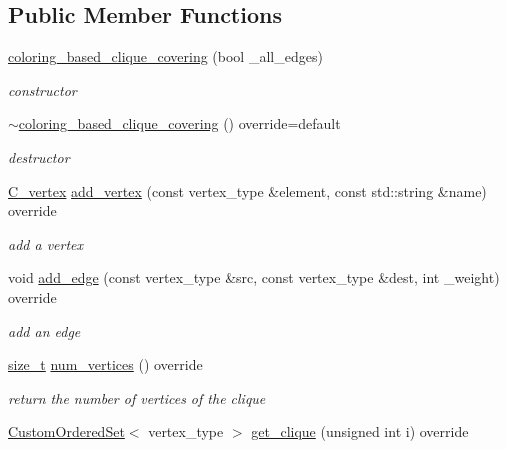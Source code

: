 \subsection*{Public Member Functions}
\begin{DoxyCompactItemize}
\item 
\hyperlink{classcoloring__based__clique__covering_a2e21f5baf4d15ba46e0be51e3edcfbe2}{coloring\+\_\+based\+\_\+clique\+\_\+covering} (bool \+\_\+all\+\_\+edges)
\begin{DoxyCompactList}\small\item\em constructor \end{DoxyCompactList}\item 
\hyperlink{classcoloring__based__clique__covering_ad61852c250484574c3b9f09de3c04a4f}{$\sim$coloring\+\_\+based\+\_\+clique\+\_\+covering} () override=default
\begin{DoxyCompactList}\small\item\em destructor \end{DoxyCompactList}\item 
\hyperlink{clique__covering__graph_8hpp_a9cb45047ea8c5ed95a8cfa90494345aa}{C\+\_\+vertex} \hyperlink{classcoloring__based__clique__covering_a1cac12eca65c32da20c7e8aee33ebf65}{add\+\_\+vertex} (const vertex\+\_\+type \&element, const std\+::string \&name) override
\begin{DoxyCompactList}\small\item\em add a vertex \end{DoxyCompactList}\item 
void \hyperlink{classcoloring__based__clique__covering_a19be6c22f60eb2aa0c9914019cc134bf}{add\+\_\+edge} (const vertex\+\_\+type \&src, const vertex\+\_\+type \&dest, int \+\_\+weight) override
\begin{DoxyCompactList}\small\item\em add an edge \end{DoxyCompactList}\item 
\hyperlink{tutorial__fpt__2017_2intro_2sixth_2test_8c_a7c94ea6f8948649f8d181ae55911eeaf}{size\+\_\+t} \hyperlink{classcoloring__based__clique__covering_a269c97e1310e645981964a841f8e5b75}{num\+\_\+vertices} () override
\begin{DoxyCompactList}\small\item\em return the number of vertices of the clique \end{DoxyCompactList}\item 
\hyperlink{classCustomOrderedSet}{Custom\+Ordered\+Set}$<$ vertex\+\_\+type $>$ \hyperlink{classcoloring__based__clique__covering_a2323722479808dd83c1df1382355e603}{get\+\_\+clique} (unsigned int i) override

\end{DoxyCompactItemize}
